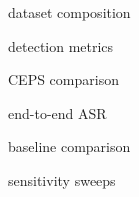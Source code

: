\caption{dataset composition}
\label{tab:dataset}

\caption{detection metrics}
\label{tab:detection}

\caption{CEPS comparison}
\label{tab:ceps}

\caption{end-to-end ASR}
\label{tab:asr}

\caption{baseline comparison}
\label{tab:baselines}

\caption{sensitivity sweeps}
\label{tab:sweeps}
